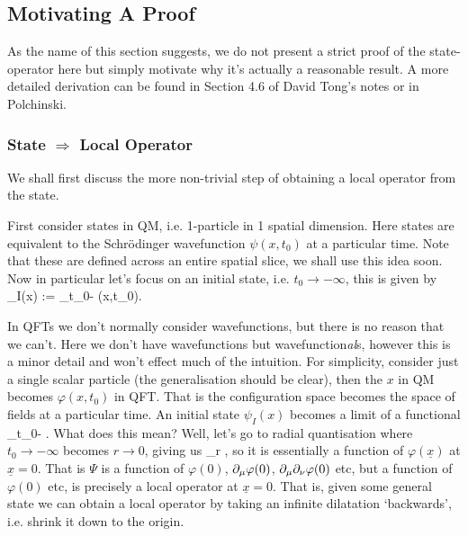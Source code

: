 \subsection{Motivating A Proof}

As the name of this section suggests, we do not present a strict proof of the state-operator here but simply motivate why it's actually a reasonable result. A more detailed derivation can be found in Section 4.6 of David Tong's notes or in Polchinski.

\subsubsection{State $\Rightarrow$ Local Operator}

We shall first discuss the more non-trivial step of obtaining a local operator from the state.

First consider states in QM, i.e. 1-particle in 1 spatial dimension. Here states are equivalent to the Schr\"{o}dinger wavefunction $\psi(x,t_0)$ at a particular time. Note that these are defined across an entire spatial slice, we shall use this idea soon. Now in particular let's focus on an initial state, i.e. $t_0 \to -\infty$, this is given by
\bse 
    \psi_I(x) := \lim_{t_0\to-\infty} \psi(x,t_0).
\ese 

In QFTs we don't normally consider wavefunctions, but there is no reason that we can't. Here we don't have wavefunctions but wavefunction\textit{al}s, however this is a minor detail and won't effect much of the intuition. For simplicity, consider just a single scalar particle (the generalisation should be clear), then the $x$ in QM becomes $\varphi(x,t_0)$ in QFT. That is the configuration space becomes the space of fields at a particular time. An initial state $\psi_I(x)$ becomes a limit of a functional
\bse 
    \lim_{t_0\to-\infty} \Psi[\varphi(x,t_0), t_0].
\ese 
What does this mean? Well, let's go to radial quantisation where $t_0\to-\infty$ becomes $r\to 0$, giving us
\bse 
    \lim_{r} ,
\ese 
so it is essentially a function of $\varphi(\underline{x})$ at $\underline{x}=0$. That is $\Psi$ is a function of $\varphi(0)$, $\partial_{\mu} \varphi(0)$, $\partial_{\mu}\partial_{\nu}\varphi(0)$ etc, but a function of $\varphi(0)$ etc, is precisely a local operator at $\underline{x}=0$. That is, given some general state we can obtain a local operator by taking an infinite dilatation `backwards', i.e. shrink it down to the origin. 

